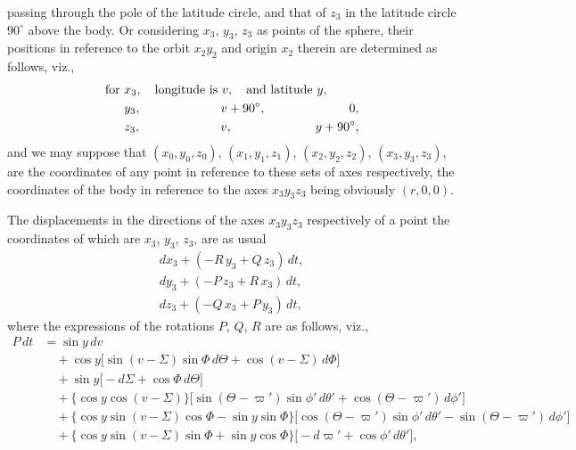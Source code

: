 \documentclass[12pt,a4paper]{article}
\theoremstyle{plain}
\begin{document}
\newpage
{} passing through the pole of the latitude circle, and that of $z_{3}$ in the latitude circle $90^{\circ}$ above the body. Or considering $x_{3}$, $y_{3}$, $z_{3}$ as points of the sphere, their positions in reference to the orbit $x_{2}y_{2}$ and origin $x_{2}$ therein are determined as follows, viz.,
\begin{align*}
&\text{for }x_{3},\quad \text{longitude is }v,\quad \text{and latitude }y,\\
&\hphantom{\text{for }}y_{3},\quad \hphantom{\text{longitude is }}v+90^{\circ},\quad \hphantom{\text{and latitude }}0,\\
&\hphantom{\text{for }}z_{3},\quad \hphantom{\text{longitude is }}v,\quad \hphantom{\text{and latitude }}y+90^{\circ},
\end{align*}
and we may suppose that $(x_{0},y_{0},z_{0})$, $(x_{1},y_{1},z_{1})$, $(x_{2},y_{2},z_{2})$, $(x_{3},y_{3},z_{3})$, are the coordinates of any point in reference to these sets of axes respectively, the coordinates of the body in reference to the axes $x_{3}y_{3}z_{3}$ being obviously $(r,0,0)$.

\medskip
The displacements in the directions of the axes $x_{3}y_{3}z_{3}$ respectively of a point the coordinates of which are $x_{3}$, $y_{3}$, $z_{3}$, are as usual
\begin{align*}
dx_{3}+(-R\,y_{3}+Q\,z_{3})\,dt,\\
dy_{3}+(-P\,z_{3}+R\,x_{3})\,dt,\\
dz_{3}+(-Q\,x_{3}+P\,y_{3})\,dt,
\end{align*}
where the expressions of the rotations $P$, $Q$, $R$ are as follows, viz.,
\begin{align*}
P\,dt &= \sin y\,dv\\
&\quad +\cos y\bigl[\sin(v-\varSigma)\sin\varPhi\,d\Theta+\cos(v-\varSigma)\,d\varPhi\bigr]\\
&\quad +\sin y\bigl[-d\varSigma+\cos\varPhi\,d\Theta\bigr]\\
&\quad +\bigl\{\cos y\cos(v-\varSigma)\bigr\}\bigl[\sin(\Theta-\varpi')\sin\phi'\,d\theta'+\cos(\Theta-\varpi')\,d\phi'\bigr]\\
&\quad +\bigl\{\cos y\sin(v-\varSigma)\cos\varPhi-\sin y\sin\varPhi\bigr\}\bigl[\cos(\Theta-\varpi')\sin\phi'\,d\theta'-\sin(\Theta-\varpi')\,d\phi'\bigr]\\
&\quad +\bigl\{\cos y\sin(v-\varSigma)\sin\varPhi+\sin y\cos\varPhi\bigr\}\bigl[-d\varpi'+\cos\phi'\,d\theta'\bigr],
\end{align*}
\end{document}
